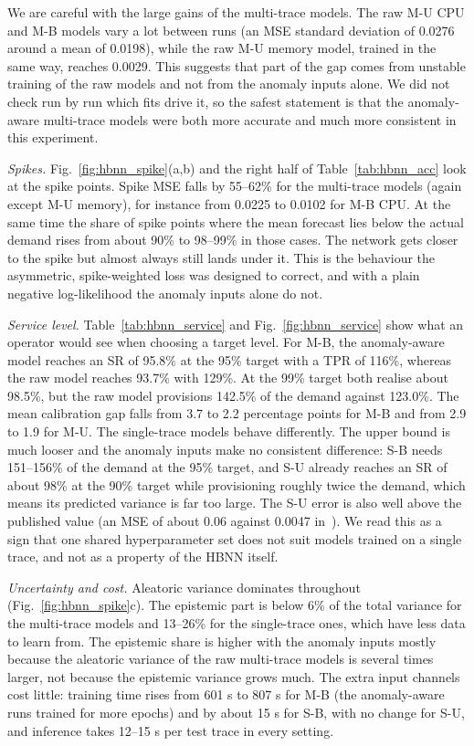 We are careful with the large gains of the multi-trace models. The raw M-U CPU and M-B models vary a lot between runs (an MSE standard deviation of 0.0276 around a mean of 0.0198), while the raw M-U memory model, trained in the same way, reaches 0.0029. This suggests that part of the gap comes from unstable training of the raw models and not from the anomaly inputs alone. We did not check run by run which fits drive it, so the safest statement is that the anomaly-aware multi-trace models were both more accurate and much more consistent in this experiment.

\textit{Spikes.}
Fig.~\ref{fig:hbnn_spike}(a,b) and the right half of Table~\ref{tab:hbnn_acc} look at the spike points. Spike MSE falls by 55--62\% for the multi-trace models (again except M-U memory), for instance from 0.0225 to 0.0102 for M-B CPU. At the same time the share of spike points where the mean forecast lies below the actual demand rises from about 90\% to 98--99\% in those cases. The network gets closer to the spike but almost always still lands under it. This is the behaviour the asymmetric, spike-weighted loss was designed to correct, and with a plain negative log-likelihood the anomaly inputs alone do not.

\textit{Service level.}
Table~\ref{tab:hbnn_service} and Fig.~\ref{fig:hbnn_service} show what an operator would see when choosing a target level. For M-B, the anomaly-aware model reaches an SR of 95.8\% at the 95\% target with a TPR of 116\%, whereas the raw model reaches 93.7\% with 129\%. At the 99\% target both realise about 98.5\%, but the raw model provisions 142.5\% of the demand against 123.0\%. The mean calibration gap falls from 3.7 to 2.2 percentage points for M-B and from 2.9 to 1.9 for M-U. The single-trace models behave differently. The upper bound is much looser and the anomaly inputs make no consistent difference: S-B needs 151--156\% of the demand at the 95\% target, and S-U already reaches an SR of about 98\% at the 90\% target while provisioning roughly twice the demand, which means its predicted variance is far too large. The S-U error is also well above the published value (an MSE of about 0.06 against 0.0047 in~\cite{rossi2025}). We read this as a sign that one shared hyperparameter set does not suit models trained on a single trace, and not as a property of the HBNN itself.

\textit{Uncertainty and cost.}
Aleatoric variance dominates throughout (Fig.~\ref{fig:hbnn_spike}c). The epistemic part is below 6\% of the total variance for the multi-trace models and 13--26\% for the single-trace ones, which have less data to learn from. The epistemic share is higher with the anomaly inputs mostly because the aleatoric variance of the raw multi-trace models is several times larger, not because the epistemic variance grows much. The extra input channels cost little: training time rises from 601 s to 807 s for M-B (the anomaly-aware runs trained for more epochs) and by about 15 s for S-B, with no change for S-U, and inference takes 12--15 s per test trace in every setting.

